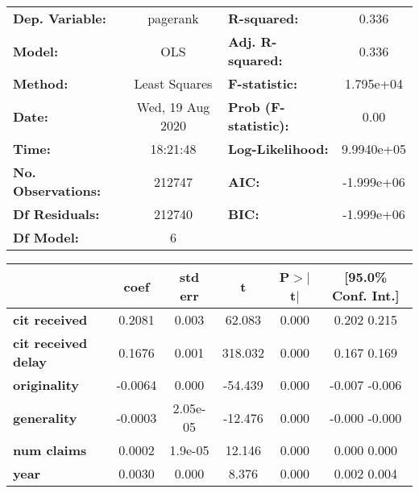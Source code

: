\begin{center}
\begin{tabular}{lclc}
\toprule
\textbf{Dep. Variable:}     &     pagerank     & \textbf{  R-squared:         } &        0.336     \\
\textbf{Model:}             &       OLS        & \textbf{  Adj. R-squared:    } &        0.336     \\
\textbf{Method:}            &  Least Squares   & \textbf{  F-statistic:       } &    1.795e+04     \\
\textbf{Date:}              & Wed, 19 Aug 2020 & \textbf{  Prob (F-statistic):} &        0.00      \\
\textbf{Time:}              &     18:21:48     & \textbf{  Log-Likelihood:    } &    9.9940e+05    \\
\textbf{No. Observations:}  &      212747      & \textbf{  AIC:               } &    -1.999e+06    \\
\textbf{Df Residuals:}      &      212740      & \textbf{  BIC:               } &    -1.999e+06    \\
\textbf{Df Model:}          &           6      & \textbf{                     } &                  \\
\bottomrule
\end{tabular}
\begin{tabular}{lccccc}
                            & \textbf{coef} & \textbf{std err} & \textbf{t} & \textbf{P$>$$|$t$|$} & \textbf{[95.0\% Conf. Int.]}  \\
\midrule
\textbf{cit received}       &       0.2081  &        0.003     &    62.083  &         0.000        &         0.202     0.215       \\
\textbf{cit received delay} &       0.1676  &        0.001     &   318.032  &         0.000        &         0.167     0.169       \\
\textbf{originality}        &      -0.0064  &        0.000     &   -54.439  &         0.000        &        -0.007    -0.006       \\
\textbf{generality}         &      -0.0003  &     2.05e-05     &   -12.476  &         0.000        &        -0.000    -0.000       \\
\textbf{num claims}         &       0.0002  &      1.9e-05     &    12.146  &         0.000        &         0.000     0.000       \\
\textbf{year}               &       0.0030  &        0.000     &     8.376  &         0.000        &         0.002     0.004       \\

\end{tabular}
\end{center}
